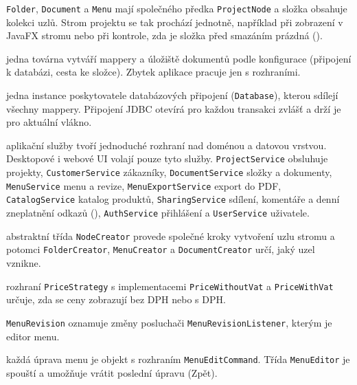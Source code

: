 \begin{description}[itemsep=2pt,style=unboxed]
  \item[Composite] \texttt{Folder}, \texttt{Document} a \texttt{Menu} mají společného předka \texttt{ProjectNode} a složka obsahuje kolekci uzlů. Strom projektu se tak prochází jednotně, například při zobrazení v JavaFX stromu nebo při kontrole, zda je složka před smazáním prázdná ().
  \item[Factory] jedna továrna vytváří mappery a úložiště dokumentů podle konfigurace (připojení k databázi, cesta ke složce). Zbytek aplikace pracuje jen s rozhraními.
  \item[Singleton] jedna instance poskytovatele databázových připojení (\texttt{Database}), kterou sdílejí všechny mappery. Připojení JDBC otevírá pro každou transakci zvlášť a drží je pro aktuální vlákno.
  \item[Facade] aplikační služby tvoří jednoduché rozhraní nad doménou a datovou vrstvou. Desktopové i webové UI volají pouze tyto služby. \texttt{ProjectService} obsluhuje projekty, \texttt{CustomerService} zákazníky, \texttt{DocumentService} složky a dokumenty, \texttt{MenuService} menu a revize, \texttt{MenuExportService} export do PDF, \texttt{CatalogService} katalog produktů, \texttt{SharingService} sdílení, komentáře a denní zneplatnění odkazů (), \texttt{AuthService} přihlášení a \texttt{UserService} uživatele.
  \item[Factory Method] abstraktní třída \texttt{NodeCreator} provede společné kroky vytvoření uzlu stromu a potomci \texttt{FolderCreator}, \texttt{MenuCreator} a \texttt{DocumentCreator} určí, jaký uzel vznikne.
  \item[Strategy] rozhraní \texttt{PriceStrategy} s implementacemi \texttt{PriceWithoutVat} a \texttt{PriceWithVat} určuje, zda se ceny zobrazují bez DPH nebo s DPH.
  \item[Observer] \texttt{MenuRevision} oznamuje změny posluchači \texttt{MenuRevisionListener}, kterým je editor menu.
  \item[Command] každá úprava menu je objekt s rozhraním \texttt{MenuEditCommand}. Třída \texttt{MenuEditor} je spouští a umožňuje vrátit poslední úpravu (Zpět).
\end{description}
